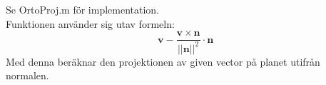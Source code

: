 Se OrtoProj.m för implementation.\\
Funktionen använder sig utav formeln:
\begin{displaymath}
    \bm{v}-\frac{\bm{v}\times \bm{n}}{||\bm{n}||^{2}}\cdot \bm{n}
\end{displaymath}
Med denna beräknar den projektionen av given vector på planet utifrån normalen.